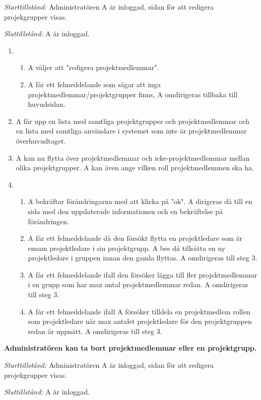 \documentclass[a4paper]{article}
\begin{document}
\begin{ST}
\emph{Starttillstånd:} Administratören A är inloggad, sidan för att redigera projekgrupper visas.

\emph{Sluttillstånd:} A är inloggad.

\begin{enumerate}
\item 
\begin{enumerate}
\item A väljer att "redigera projektmedlemmar".
\item A får ett felmeddelande som sägar att inga projektmedlemmar/projektgrupper finns, A omdirigeras tillbaka till huvudsidan.
\end{enumerate}
\item A får upp en lista med samtliga projektgrupper och projektmedlemmar och en lista med samtliga användare i systemet som inte är projektmedlemmar överhuvudtaget.

\item A kan nu flytta över projektmedlemmar och icke-projektmedlemmar mellan olika projektgrupper. A kan även ange vilken roll projektmedlemmen ska ha.
\item 
\begin{enumerate}
\item A bekräftar förändringarna med att klicka på "ok". A dirigeras då till en sida med den uppdaterade informationen och en bekräftelse på förändringen.
\item A får ett felmeddelande då den försökt flytta en projektledare som är ensam projektledare i sin projektgrupp. A bes då tillsätta en ny projektledare i gruppen innan den gamla flyttas. A omdirigeras till steg 3.
\item A får ett felmeddelande ifall den försöker lägga till fler projektmedlemmar i en grupp som har max antal projektmedlemmar redan. A omdirigeras till steg 3.
\item A får ett felmeddelande ifall A försöker tilldela en projektmedlem rollen som projektledare när max antalet projektledare för den projektgruppen redan är uppnått. A omdirigeras till steg 3.
\end{enumerate}
\end{enumerate}

\item
\textbf{Administratören kan ta bort projektmedlemmar eller en projektgrupp.}

\emph{Starttillstånd:} Administratören A är inloggad, sidan för att redigera projekgrupper visas.

\emph{Sluttillstånd:} A är inloggad.


\end{ST}
\end{document}
